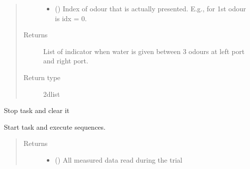 \documentclass[letterpaper,10pt,english]{sphinxmanual}
\begin{document}
\begin{fulllineitems}
\begin{fulllineitems}
\begin{quote}
\begin{description}
\begin{itemize}
\item {} 
\sphinxAtStartPar
{} () \textendash{} Index of odour that is actually presented. E.g., for 1st odour is
idx = 0.

\end{itemize}

\item[{Returns}] \leavevmode
\sphinxAtStartPar
{} \textendash{} List of indicator when water is given between 3 odours at left port
and right port.

\item[{Return type}] \leavevmode
\sphinxAtStartPar
2d\sphinxhyphen{}list

\end{description}\end{quote}

\end{fulllineitems}


\begin{fulllineitems}
\label{\detokenize{NoSeMazeControl/daqface:daqface.DAQ.DoAiConcatenatedPretrainingMultiTask.ClearTasks}}
\pysigstartsignatures
{}
\pysigstopsignatures
\sphinxAtStartPar
Stop task and clear it

\end{fulllineitems}


\begin{fulllineitems}
\label{\detokenize{NoSeMazeControl/daqface:daqface.DAQ.DoAiConcatenatedPretrainingMultiTask.DoTask}}
\pysigstartsignatures
{}
\pysigstopsignatures
\sphinxAtStartPar
Start task and execute sequences.
\begin{quote}\begin{description}
\item[{Returns}] \leavevmode
\sphinxAtStartPar
\begin{itemize}
\item {} 
\sphinxAtStartPar
{} () \textendash{} All measured data read during the trial


\end{itemize}
\end{description}
\end{quote}
\end{fulllineitems}
\end{fulllineitems}
\end{document}
